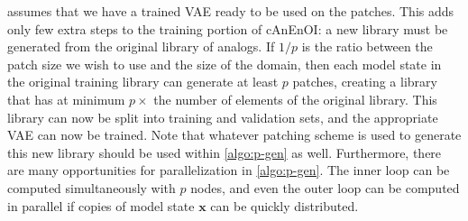 \documentclass[final,3p]{elsarticle}
\theoremstyle{break}
\newcommand{\bb}[1]{\mathbf{#1}}
\begin{document}
 assumes that we have a trained VAE ready to be used on the patches. 
This adds only few extra steps to the training portion of cAnEnOI: a new library must be generated from the original library of analogs.
If $1/p$ is the ratio between the patch size we wish to use and the size of the domain, then each model state in the original training library can generate at least $p$ patches, creating a library that has at minimum $p\times$ the number of elements of the original library. 
This library can now be split into training and validation sets, and the appropriate VAE can now be trained.
Note that whatever patching scheme is used to generate this new library should be used within \cref{algo:p-gen} as well. 
Furthermore, there are many opportunities for parallelization in \cref{algo:p-gen}. 
The inner loop can be computed simultaneously with $p$ nodes, and even the outer loop can be computed in parallel if copies of model state $\bb{x}$ can be quickly distributed.
\end{document}
